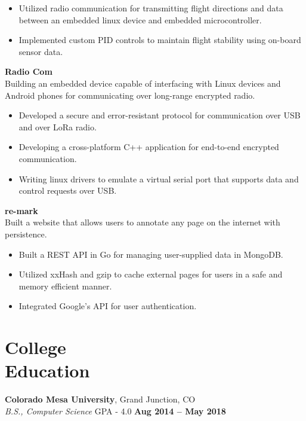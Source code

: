 \documentclass[margin,line]{resume}
\begin{document}
\begin{resume}
	\begin{itemize}
	\item Utilized radio communication for transmitting
	      flight directions and data between an embedded linux
	      device and embedded microcontroller.
	\item Implemented custom PID controls to maintain flight stability
	      using on-board sensor data.
	\end{itemize}

    \textbf{Radio Com}\\
    Building an embedded device capable of interfacing with Linux devices and
    Android phones for communicating over long-range encrypted radio.

        \begin{itemize}
        \item Developed a secure and error-resistant protocol for communication
              over USB and over LoRa radio.
        \item Developing a cross-platform C++ application for end-to-end encrypted
              communication.
        \item Writing linux drivers to emulate a virtual serial port that supports
              data and control requests over USB.
	\end{itemize}


    \textbf{re-mark}\\
    Built a website that allows users to annotate any page on the internet
    with persistence.

        \begin{itemize}
        \item Built a REST API in Go for managing user-supplied data in MongoDB.
        \item Utilized xxHash and gzip to cache external pages for users in
              a safe and memory efficient manner.
        \item Integrated Google's API for user authentication.
        \end{itemize}

    \section{\mysidestyle College\\Education}

    \textbf{Colorado Mesa University}, Grand Junction, CO \vspace{2mm}\\\vspace{1mm}%
    \textsl{B.S., Computer Science} GPA - 4.0 \hfill \textbf{Aug 2014 -- May 2018}


\end{resume}
\end{document}
